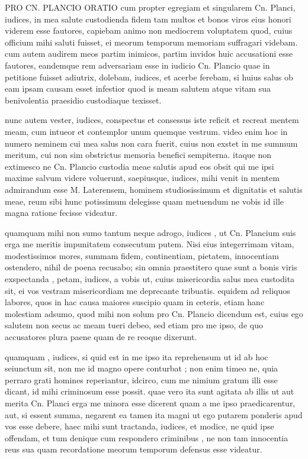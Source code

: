 
 PRO CN. PLANCIO ORATIO cum propter egregiam et singularem Cn. Planci, iudices, in mea salute custodienda fidem tam multos et bonos viros eius honori viderem esse fautores, capiebam animo non mediocrem voluptatem quod, cuius officium mihi saluti fuisset, ei meorum temporum memoriam suffragari videbam. cum autem audirem meos partim inimicos, partim invidos huic accusationi esse fautores, eandemque rem adversariam esse in iudicio Cn. Plancio quae in petitione fuisset adiutrix, dolebam, iudices, et acerbe ferebam, si huius salus ob eam ipsam causam esset infestior quod is meam salutem atque vitam sua benivolentia praesidio custodiaque texisset.

 nunc autem vester, iudices, conspectus et consessus iste reficit et recreat mentem meam, cum intueor et contemplor unum quemque vestrum. video enim hoc in numero neminem cui mea salus non cara fuerit, cuius non exstet in me summum meritum, cui non sim obstrictus memoria benefici sempiterna. itaque non extimesco ne Cn. Plancio custodia meae salutis apud eos obsit qui me ipsi maxime salvum videre voluerunt, saepiusque, iudices, mihi venit in mentem admirandum esse M. Laterensem, hominem studiosissimum et dignitatis et salutis meae, reum sibi hunc potissimum delegisse quam metuendum ne vobis id ille magna ratione fecisse videatur.

 quamquam mihi non sumo tantum neque adrogo, iudices , ut Cn. Plancium suis erga me meritis impunitatem consecutum putem. Nisi eius integerrimam vitam, modestissimos mores, summam fidem, continentiam, pietatem, innocentiam ostendero, nihil de poena recusabo; sin omnia praestitero quae sunt a bonis viris exspectanda , petam, iudices, a vobis ut, cuius misericordia salus mea custodita sit, ei vos vestram misericordiam me deprecante tribuatis. equidem ad reliquos labores, quos in hac causa maiores suscipio quam in ceteris, etiam hanc molestiam adsumo, quod mihi non solum pro Cn. Plancio dicendum est, cuius ego salutem non secus ac meam tueri debeo, sed etiam pro me ipso, de quo accusatores plura paene quam de re reoque dixerunt.

 quamquam , iudices, si quid est in me ipso ita reprehensum ut id ab hoc seiunctum sit, non me id magno opere conturbat ; non enim timeo ne, quia perraro grati homines reperiantur, idcirco, cum me nimium gratum illi esse dicant, id mihi criminosum esse possit. quae vero ita sunt agitata ab illis ut aut merita Cn. Planci erga me minora esse dicerent quam a me ipso praedicarentur, aut, si essent summa, negarent ea tamen ita magni ut ego putarem ponderis apud vos esse debere, haec mihi sunt tractanda, iudices, et modice, ne quid ipse offendam, et tum denique cum respondero criminibus , ne non tam innocentia reus sua quam recordatione meorum temporum defensus esse videatur.

